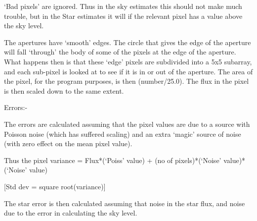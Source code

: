 \begin{small}
{{   `Bad pixels' are ignored. Thus in the sky estimates this should
   not make much trouble, but in the Star estimates it will if the
   relevant pixel has a value above the sky level.
                                                                              
   The apertures have `smooth' edges. The circle that gives the
   edge of the aperture will fall `through' the body of some of the
   pixels at the edge of the aperture. What happens then is that these
   `edge' pixels are subdivided into a 5x5 subarray, and each sub-pixel
   is looked at to see if it is in or out of the aperture. The area of
   the pixel, for the program purposes, is then (number/25.0). The
   flux in the pixel is then scaled down to the same extent.
                                                                              
   Errors:-
                                                                              
   The errors are calculated assuming that the pixel values are due
   to a source with Poisson noise (which has suffered scaling) and
   an extra `magic' source of noise (with zero effect on the mean
   pixel value).

   Thus the pixel variance = Flux*(`Poiss' value) +
                          (no of pixels)*(`Noise' value)*(`Noise' value)
                                                                              
   [Std dev = square root(variance)]
                                                                              
   The star error is then calculated assuming that noise in the star
   flux, and noise due to the error in calculating the sky level.
                                                                              
}}
\end{small}
